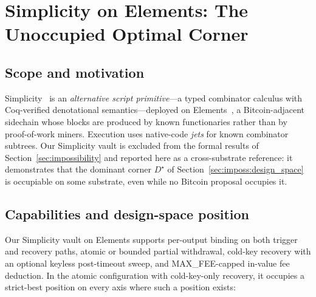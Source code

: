 
\section{Simplicity on Elements: The Unoccupied Optimal Corner}
\label{app:simplicity}

\subsection{Scope and motivation}
\label{app:simplicity:scope}

Simplicity~\cite{OC17} is an \emph{alternative script primitive}---a
typed combinator calculus with Coq-verified denotational
semantics---deployed on Elements~\cite{DPNS16}, a Bitcoin-adjacent
sidechain whose blocks are produced by known functionaries rather
than by proof-of-work miners. Execution uses native-code
\emph{jets} for known combinator subtrees. Our Simplicity vault is
excluded from the formal results of Section~\ref{sec:impossibility}
and reported here as a cross-substrate reference: it demonstrates
that the dominant corner $D^\star$ of
Section~\ref{sec:imposs:design_space} is occupiable on some
substrate, even while no Bitcoin proposal occupies it.

\subsection{Capabilities and design-space position}
\label{app:simplicity:axes}

Our Simplicity vault on Elements supports per-output binding on both
trigger and recovery paths, atomic or bounded partial withdrawal,
cold-key recovery with an optional keyless post-timeout sweep, and
MAX\_FEE-capped in-value fee deduction. In the atomic configuration
with cold-key-only recovery, it occupies a strict-best position on
every axis where such a position exists:

